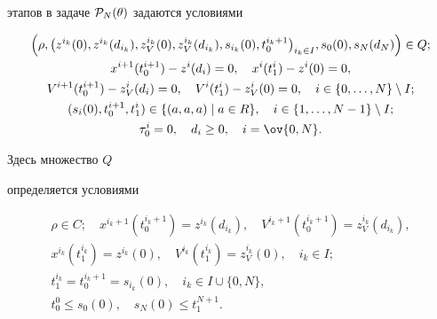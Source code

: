 этапов в задаче ${\cal P}_{N}(\theta)$ задаются условиями


\begin{gather*}


\Big(\rho,\big(z^{i_k}(0),z^{i_k}(d_{i_k}),z_V^{i_k}(0),


z_V^{i_k}(d_{i_k}) ,


s_{i_k}(0),t_0^{i_k+1}\big)_{i_k\in I},s_0(0),s_N(d_N)\Big)\in Q;\\


%


x^{i+1}(t_0^{i+1})-z^i(d_i)=0,\quad


x^{i}(t_1^{i})-z^i(0)=0, \\


%


V^{i+1}(t_0^{i+1})-z_V^i(d_i)=0,\quad


V^{i}(t_1^{i})-z_V^i(0)=0,\quad  i\in


\{0,\dotsc,N\}\setminus I; \\


%


(s_i(0),t_0^{i+1},t_1^i)\in \{(a,a,a)\mid a\in R\}, \quad


i\in \{1,\dotsc,N-1\}\setminus I; \\


%


\tau_0^i=0,\quad d_i\geq


0,\quad i=\ov{0,N} .


\end{gather*}


Здесь множество $Q$


определяется условиями 


\begin{gather*}


\rho\in C;\quad x^{i_k+1}(t_0^{i_k+1})=z^{i_k}(d_{i_k}),\quad


V^{i_k+1}(t_0^{i_k+1})=z_V^{i_k}(d_{i_k}),\\


x^{i_k}(t_1^{i_k})=z^{i_k}(0),\quad


V^{i_k}(t_1^{i_k})=z_V^{i_k}(0),\quad i_k\in I; \\


t_1^{i_k}=t_0^{i_k+1}=s_{i_k}(0),\quad i_k\in I\cup\{0,N\},\\


t_0^0\leq s_0(0),\quad s_N(0)\leq t_1^{N+1}.


\end{gather*}





